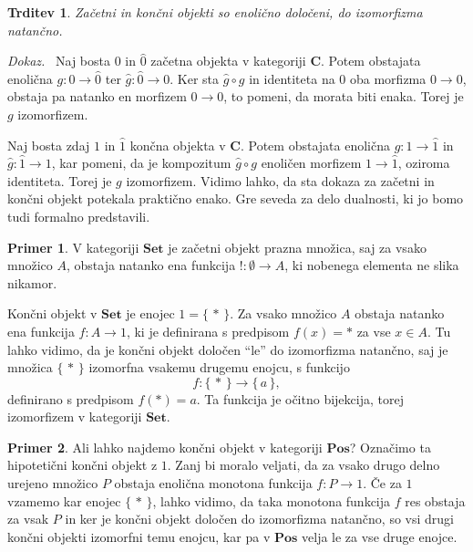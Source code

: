 \documentclass[12pt,a4paper]{book}
\theoremstyle{definition}
\theoremstyle{plain}
\newtheorem{trditev}[definicija]{Trditev}
\newenvironment{dokaz}{\emph{Dokaz.}\ }{\hspace{\fill}{$\Box$}}
\theoremstyle{definition}
\newtheorem{primer}{Primer}[section]
\theoremstyle{remark}
\newcommand{\cat}[1]{\textbf{#1}}
\renewcommand{\set}[1]{\{\,#1\,\}}
\begin{document}
\begin{trditev}
Začetni in končni objekti so enolično določeni, do izomorfizma natančno.
\end{trditev}
\begin{dokaz}
Naj bosta $0$ in $\hat{0}$ začetna objekta v kategoriji $\cat{C}$. Potem obstajata enolična $g : 0 \to \hat{0}$ ter $\hat{g} : \hat{0} \to 0$. Ker sta $\hat{g} \circ g$ in identiteta na $0$ oba morfizma $0 \to 0$, obstaja pa natanko en morfizem $0 \to 0$, to pomeni, da morata biti enaka. Torej je $g$ izomorfizem.

Naj bosta zdaj $1$ in $\hat{1}$ končna objekta v $\cat{C}$. Potem obstajata enolična $g : 1 \to \hat{1}$ in $\hat{g} : \hat{1} \to 1$, kar pomeni, da je kompozitum $\hat{g} \circ g$ enoličen morfizem $1 \to \hat{1}$, oziroma identiteta. Torej je $g$ izomorfizem.
\end{dokaz}
Vidimo lahko, da sta dokaza za začetni in končni objekt potekala praktično enako. Gre seveda za delo dualnosti, ki jo bomo tudi formalno predstavili.

\begin{primer}
V kategoriji $\cat{Set}$ je začetni objekt prazna množica, saj za vsako množico $A$, obstaja natanko ena funkcija $! : \emptyset \to A$, ki nobenega elementa ne slika nikamor. 

Končni objekt v $\cat{Set}$ je enojec $1 = \set{*}$. Za vsako množico $A$ obstaja natanko ena funkcija $f : A \to 1$, ki je definirana s predpisom $f(x) = *$ za vse $x \in A$. Tu lahko vidimo, da je končni objekt določen "`le"' do izomorfizma natančno, saj je množica $\set{*}$ izomorfna vsakemu drugemu enojcu, s funkcijo 
$$f : \set{*} \to \set{a},$$
definirano s predpisom $f(*) = a$. Ta funkcija je očitno bijekcija, torej izomorfizem v kategoriji $\cat{Set}$.
\end{primer}


\begin{primer}
Ali lahko najdemo končni objekt v kategoriji $\cat{Pos}$? Označimo ta hipotetični končni objekt z $1$. Zanj bi moralo veljati, da za vsako drugo delno urejeno množico $P$ obstaja enolična monotona funkcija $f : P \to 1$. Če za $1$ vzamemo kar enojec $\set{*}$, lahko vidimo, da taka monotona funkcija $f$ res obstaja za vsak $P$ in ker je končni objekt določen do izomorfizma natančno, so vsi drugi končni objekti izomorfni temu enojcu, kar pa v $\cat{Pos}$ velja le za vse druge enojce.
\end{primer}
\end{document}
